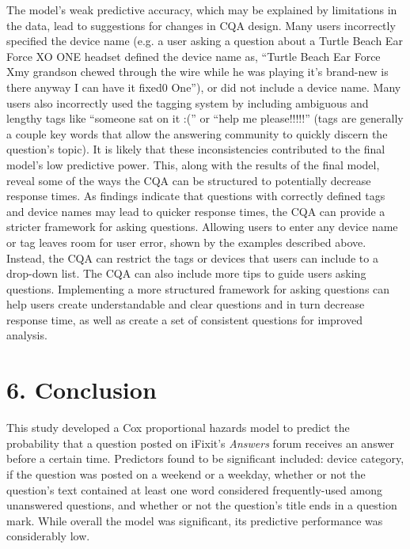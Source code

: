\documentclass{article}
\begin{document}
The model's weak predictive accuracy, which may be explained by limitations in the data, lead to suggestions for changes in CQA design. Many users incorrectly specified the device name (e.g. a user asking a question about a Turtle Beach Ear Force XO ONE headset defined the device name as, ``Turtle Beach Ear Force Xmy grandson chewed through the wire while he was playing it's brand-new is there anyway I can have it fixed0 One''), or did not include a device name. Many users also incorrectly used the tagging system by including ambiguous and lengthy tags like ``someone sat on it :('' or ``help me please!!!!!'' (tags are generally a couple key words that allow the answering community to quickly discern the question's topic). It is likely that these inconsistencies contributed to the final model's low predictive power. This, along with the results of the final model, reveal some of the ways the CQA can be structured to potentially decrease response times. As findings indicate that questions with correctly defined tags and device names may lead to quicker response times, the CQA can provide a stricter framework for asking questions. Allowing users to enter any device name or tag leaves room for user error, shown by the examples described above. Instead, the CQA can restrict the tags or devices that users can include to a drop-down list. The CQA can also include more tips to guide users asking questions. Implementing a more structured framework for asking questions can help users create understandable and clear questions and in turn decrease response time, as well as create a set of consistent questions for improved analysis. 


\section*{6. Conclusion}

This study developed a Cox proportional hazards model to predict the probability that a question posted on iFixit's \textit{Answers} forum receives an answer before a certain time. Predictors found to be significant included: device category, if the question was posted on a weekend or a weekday, whether or not the question's text contained at least one word considered frequently-used among unanswered questions, and whether or not the question's title ends in a question mark. While overall the model was significant, its predictive performance was considerably low. 
\end{document}
